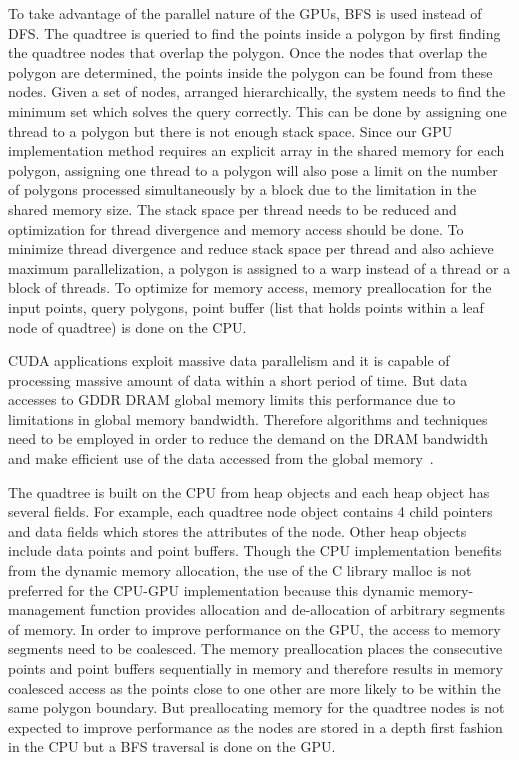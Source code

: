 To take advantage of the parallel nature of the GPUs, BFS is used instead of DFS. 
The quadtree is queried to find the points inside a polygon by first finding the quadtree nodes that overlap the polygon. Once the nodes that overlap the polygon are determined, the points inside the polygon can be found from these nodes. Given a set of nodes, arranged hierarchically, the system needs to find the minimum set which solves the query correctly. This can be done by assigning one thread to a polygon but there is not enough stack space. Since our GPU implementation method requires an explicit array in the shared memory for each polygon, assigning one thread to a polygon will also pose a limit on the number of polygons processed simultaneously by a block due to the limitation in the shared memory size.
The stack space per thread needs to be reduced and optimization for thread divergence and memory access should be done. To minimize thread divergence and reduce stack space per thread and also achieve maximum parallelization, a polygon is assigned to a warp instead of a thread or a block of threads. To optimize for memory access, memory preallocation for the input points, query polygons, point buffer (list that holds points within a leaf node of quadtree) is done on the CPU.

CUDA applications exploit massive data parallelism and it is capable of processing massive amount of data within a short period of time. But data accesses to GDDR DRAM global memory limits this performance due to limitations in global memory bandwidth. Therefore algorithms and techniques need to be employed in order to reduce the demand on the DRAM bandwidth  and make efficient use of the data accessed from the global memory~\cite{Kirk:2010:PMP:1841511}.


The quadtree is built on the CPU from heap objects and each heap object has several fields. For example, each quadtree node object contains 4 child pointers and  data fields which stores the attributes of the node. Other heap objects include data points and point buffers. 
Though the CPU implementation benefits from the dynamic memory allocation, the use of the C library malloc is not preferred for the CPU-GPU implementation because this dynamic memory-management function provides allocation and de-allocation of arbitrary segments of memory. In order to improve performance on the GPU, the access to memory segments need to be coalesced. The memory preallocation places the consecutive points and point buffers sequentially in memory and therefore results in memory coalesced access as the points close to one other are more likely to be within the same polygon boundary. But preallocating memory for the  quadtree nodes is not expected to improve performance as the nodes are stored in a depth first fashion in the CPU but a BFS traversal is done on the GPU.

